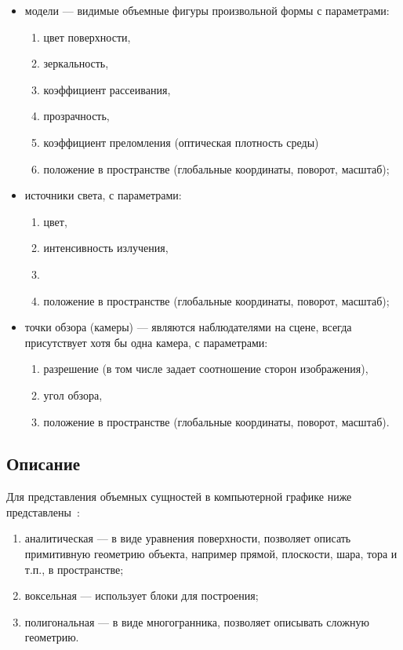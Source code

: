 \begin{itemize}
	\item модели --- видимые объемные фигуры произвольной формы с параметрами:
	\begin{enumerate}
		\item цвет поверхности,
		\item зеркальность,
		\item коэффициент рассеивания,
		\item прозрачность,
		\item коэффициент преломления (оптическая плотность среды)
		\item положение в пространстве (глобальные координаты, поворот, масштаб);
	\end{enumerate}
	\item источники света, с параметрами: 
	\begin{enumerate}
		\item цвет,
		\item интенсивность излучения,
		\item \item положение в пространстве (глобальные координаты, поворот, масштаб);
	\end{enumerate}
	\item точки обзора (камеры) --- являются наблюдателями на сцене, всегда присутствует хотя бы одна камера, с параметрами:
	\begin{enumerate}
		\item разрешение (в том числе задает соотношение сторон изображения),
		\item угол обзора,
		\item положение в пространстве (глобальные координаты, поворот, масштаб).
	\end{enumerate}
\end{itemize}


\subsection{Описание}
Для представления объемных сущностей в компьютерной графике ниже представлены~\cite[с.с.~341--350]{cg-priciples}:
\begin{enumerate}
	\item аналитическая --- в виде уравнения поверхности, позволяет описать примитивную геометрию объекта, например прямой, плоскости, шара, тора и т.п., в пространстве;
	\item воксельная --- использует блоки для построения;
	\item полигональная --- в виде многогранника, позволяет описывать сложную геометрию.
\end{enumerate}

